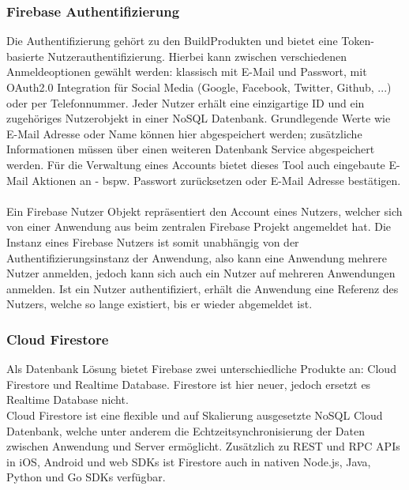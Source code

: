 \subsubsection{Firebase Authentifizierung}
Die Authentifizierung gehört zu den \glqq Build\grqq Produkten und bietet eine Token-basierte Nutzerauthentifizierung. 
Hierbei kann zwischen verschiedenen Anmeldeoptionen gewählt werden: klassisch mit E-Mail und Passwort, mit OAuth2.0 Integration für Social Media (Google, Facebook, Twitter, Github, ...) oder per Telefonnummer.
Jeder Nutzer erhält eine einzigartige ID und ein zugehöriges Nutzerobjekt in einer NoSQL Datenbank. Grundlegende Werte wie E-Mail Adresse oder Name können hier abgespeichert werden; zusätzliche Informationen müssen über einen weiteren Datenbank Service abgespeichert werden.
Für die Verwaltung eines Accounts bietet dieses Tool auch eingebaute E-Mail Aktionen an - bspw. Passwort zurücksetzen oder E-Mail Adresse bestätigen.\\
\\
Ein Firebase Nutzer Objekt repräsentiert den Account eines Nutzers, welcher sich von einer Anwendung aus beim zentralen Firebase Projekt angemeldet hat.
Die Instanz eines Firebase Nutzers ist somit unabhängig von der Authentifizierungsinstanz der Anwendung, also kann eine Anwendung mehrere Nutzer anmelden, jedoch kann sich auch ein Nutzer auf mehreren Anwendungen anmelden.
Ist ein Nutzer authentifiziert, erhält die Anwendung eine Referenz des Nutzers, welche so lange existiert, bis er wieder abgemeldet ist.\cite{firebase2021}

\subsubsection{Cloud Firestore}
\label{sec:firestore}
Als Datenbank Lösung bietet Firebase zwei unterschiedliche Produkte an: Cloud Firestore und Realtime Database.
Firestore ist hier neuer, jedoch ersetzt es Realtime Database nicht. \\
Cloud Firestore ist eine flexible und auf Skalierung ausgesetzte NoSQL Cloud Datenbank, welche unter anderem die Echtzeitsynchronisierung der Daten zwischen Anwendung und Server ermöglicht.
Zusätzlich zu REST und RPC APIs in iOS, Android und web SDKs ist Firestore auch in nativen Node.js, Java, Python und Go SDKs verfügbar.\\
\\

